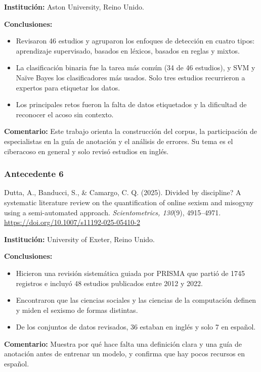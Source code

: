 \noindent\textbf{Institución:} Aston University, Reino Unido.

\noindent\textbf{Conclusiones:}
\begin{itemize}
	\item Revisaron 46 estudios y agruparon los enfoques de detección en cuatro tipos: aprendizaje supervisado, basados en léxicos, basados en reglas y mixtos.
	\item La clasificación binaria fue la tarea más común (34 de 46 estudios), y SVM y Naïve Bayes los clasificadores más usados. Solo tres estudios recurrieron a expertos para etiquetar los datos.
	\item Los principales retos fueron la falta de datos etiquetados y la dificultad de reconocer el acoso sin contexto.
\end{itemize}

\noindent\textbf{Comentario:} Este trabajo orienta la construcción del corpus, la participación de especialistas en la guía de anotación y el análisis de errores. Su tema es el ciberacoso en general y solo revisó estudios en inglés.

\subsubsection{Antecedente 6}
\noindent Dutta, A., Banducci, S., \& Camargo, C. Q. (2025). Divided by discipline? A systematic literature review on the quantification of online sexism and misogyny using a semi-automated approach. \textit{Scientometrics, 130}(9), 4915--4971. \url{https://doi.org/10.1007/s11192-025-05410-2}

\noindent\textbf{Institución:} University of Exeter, Reino Unido.

\noindent\textbf{Conclusiones:}
\begin{itemize}
	\item Hicieron una revisión sistemática guiada por PRISMA que partió de 1745 registros e incluyó 48 estudios publicados entre 2012 y 2022.
	\item Encontraron que las ciencias sociales y las ciencias de la computación definen y miden el sexismo de formas distintas.
	\item De los conjuntos de datos revisados, 36 estaban en inglés y solo 7 en español.
\end{itemize}

\noindent\textbf{Comentario:} Muestra por qué hace falta una definición clara y una guía de anotación antes de entrenar un modelo, y confirma que hay pocos recursos en español.

